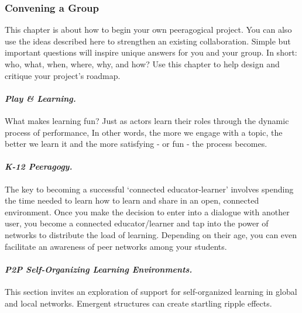 \hypertarget{convening-a-group}{%
\subsubsection{Convening a Group}\label{convening-a-group}}

This chapter is about how to begin your own peeragogical project. You
can also use the ideas described here to strengthen an existing
collaboration. Simple but important questions will inspire unique
answers for you and your group. In short: who, what, when, where, why,
and how? Use this chapter to help design and critique your project's
roadmap.

\hypertarget{play-learning.}{%
\paragraph{\texorpdfstring{\emph{Play \&
Learning.}}{Play \& Learning.}}\label{play-learning.}}

What makes learning fun? Just as actors learn their roles through the
dynamic process of performance, In other words, the more we engage with
a topic, the better we learn it and the more satisfying - or fun - the
process becomes.

\hypertarget{k-12-peeragogy.}{%
\paragraph{\texorpdfstring{\emph{K-12
Peeragogy.}}{K-12 Peeragogy.}}\label{k-12-peeragogy.}}

The key to becoming a successful `connected educator-learner' involves
spending the time needed to learn how to learn and share in an open,
connected environment. Once you make the decision to enter into a
dialogue with another user, you become a connected educator/learner and
tap into the power of networks to distribute the load of learning.
Depending on their age, you can even facilitate an awareness of peer
networks among your students.

\hypertarget{p2p-self-organizing-learning-environments.}{%
\paragraph{\texorpdfstring{\emph{P2P Self-Organizing Learning
Environments.}}{P2P Self-Organizing Learning Environments.}}\label{p2p-self-organizing-learning-environments.}}

This section invites an exploration of support for self-organized
learning in global and local networks. Emergent structures can create
startling ripple effects.

